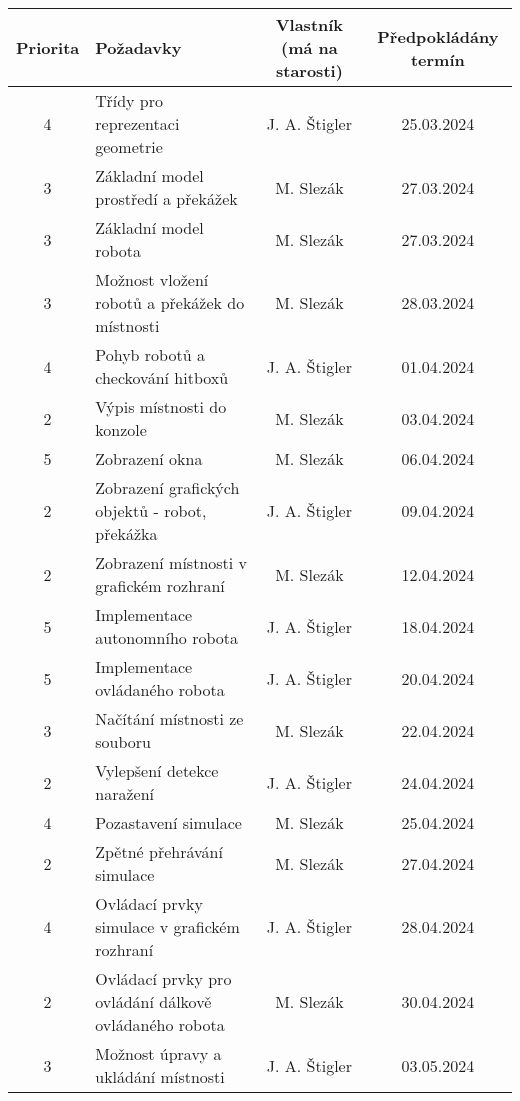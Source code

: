 \documentclass{article}
\begin{document}
\begin{table}[h]
    \centering
    \begin{tabular}{ |c|>{\raggedright\arraybackslash}p{4cm}|c|c| }
        \hline
        \rowcolor{blue!25}Priorita & Požadavky & Vlastník (má na starosti) &
        Předpokládány termín \\
        \hline
        \rowcolor{green!25}4 & Třídy pro reprezentaci geometrie &
            J. A. Štigler & 25.03.2024 \\
        \hline
        \rowcolor{green!25}3 & Základní model prostředí a překážek &
            M. Slezák & 27.03.2024 \\
        \hline
        \rowcolor{green!25}3 & Základní model robota & M. Slezák &
            27.03.2024 \\
        \hline
        \rowcolor{green!25}3 & Možnost vložení robotů a překážek do místnosti &
            M. Slezák & 28.03.2024 \\
        \hline
        \rowcolor{green!25}4 & Pohyb robotů a checkování hitboxů &
            J. A. Štigler & 01.04.2024 \\
        \hline
        \rowcolor{green!25}2 & Výpis místnosti do konzole & M. Slezák &
        03.04.2024 \\
        \hline
        5 & Zobrazení okna & M. Slezák & 06.04.2024 \\
        \hline
        2 & Zobrazení grafických objektů - robot, překážka & J. A. Štigler &
        09.04.2024 \\
        \hline
        2 & Zobrazení místnosti v grafickém rozhraní & M. Slezák &
        12.04.2024 \\
        \hline
        5 & Implementace autonomního robota & J. A. Štigler & 18.04.2024 \\
        \hline
        5 & Implementace ovládaného robota & J. A. Štigler & 20.04.2024 \\
        \hline
        3 & Načítání místnosti ze souboru & M. Slezák & 22.04.2024 \\
        \hline
        2 & Vylepšení detekce naražení & J. A. Štigler & 24.04.2024 \\
        \hline
        4 & Pozastavení simulace & M. Slezák & 25.04.2024 \\
        \hline
        2 & Zpětné přehrávání simulace & M. Slezák & 27.04.2024 \\
        \hline
        4 & Ovládací prvky simulace v grafickém rozhraní & J. A. Štigler &
            28.04.2024 \\
        \hline
        2 & Ovládací prvky pro ovládání dálkově ovládaného robota &
            M. Slezák & 30.04.2024 \\
        \hline
        3 & Možnost úpravy a ukládání místnosti & J. A. Štigler & 03.05.2024 \\
        \hline
    \end{tabular}
\end{table}
\end{document}
